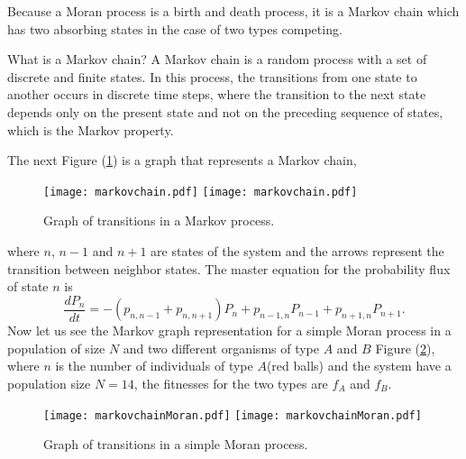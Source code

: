 Because a Moran process is a birth and death process, it is a Markov chain which has two absorbing states in the case of two types competing.

What is a Markov chain? A Markov chain is a random process with a set of discrete and finite states. In this process, the transitions from one state to another occurs in discrete time steps, where the transition to the next state depends only on the present state and not on the preceding sequence of states, which is the Markov property.

The next Figure (\ref{Fig42})  is a graph that represents a Markov chain, 
\begin{figure}[H]
 \begin{center}
    \leavevmode
    \ifpdf
      \texttt{[image: markovchain.pdf]}
    \else
     \texttt{[image: markovchain.pdf]}
    \fi
    \caption{Graph of transitions in a Markov process.}
    
    \label{Fig42}
  \end{center}
  \end{figure}

where $n$, $n-1$ and $n+1$ are states of the system and the arrows represent the transition between neighbor states. The master equation for the probability flux of state $n$ is
\begin{equation}\label{4.1}
\frac{dP_{n}}{dt}=-(p_{n,n-1}+p_{n,n+1})P_{n}+p_{n-1,n}P_{n-1}+p_{n+1,n}P_{n+1}.
\end{equation} 
Now let us see the Markov graph representation for a simple Moran process in a population of size $N$ and two different organisms of type $A$ and $B$ Figure (\ref{Fig43}), where $n$ is the number of individuals of type $A$(red balls) and the system have a  population size $N=14$, the fitnesses for the two types are $f_{A}$ and $f_{B}$.
\begin{figure}[H]
 \begin{center}
    \leavevmode
    \ifpdf
      \texttt{[image: markovchainMoran.pdf]}
    \else
     \texttt{[image: markovchainMoran.pdf]}
    \fi
    \caption{Graph of transitions in a simple Moran process.}
    \label{Fig43}
  \end{center}
  \end{figure}

